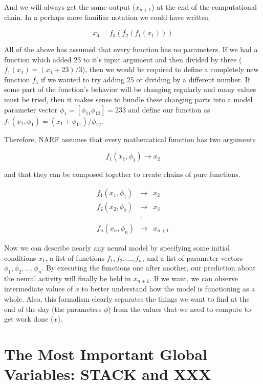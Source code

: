 \documentclass[letterpaper]{report}
\begin{document}
And we will always get the same output ($x_{n+1}$) at the end of the computational chain. In a perhaps more familiar notation we could have written

\begin{equation}
x_{4} = f_3(f_2(f_1(x_1)))
\end{equation}

All of the above has assumed that every function has no parameters. If we had a function which added 23 to it's input argument and then divided by three ($f_1(x_1) = (x_1 + 23) / 3 $), then we would be required to define a completely new function $f_1$ if we wanted to try adding 25 or dividing by a different number. If some part of the function's behavior will be changing regularly and many values must be tried, then it makes sense to bundle these changing parts into a model parameter vector $\phi_1 = [\phi_{11} \phi_{12}] = 23 3$ and define our function as $f_1(x_1, \phi_1) = (x_1 + \phi_{11}) / \phi_{12}$.

Therefore, NARF assumes that every mathematical function has two arguments

\begin{equation}
  f_1(x_1, \phi_1) \rightarrow x_2
\end{equation}

and that they can be composed together to create chains of pure functions. 

\begin{eqnarray*}
f_{1}(x_{1}, \phi_1) & \rightarrow & x_{2}\\
f_{2}(x_{2}, \phi_2) & \rightarrow & x_{3}\\
 & \vdots\\
f_{n}(x_{n}, \phi_n) & \rightarrow & x_{n+1}
\end{eqnarray*}

Now we can describe nearly any neural model by specifying some initial conditions $x_1$, a list of functions $f_1, f_2, ..., f_n$, and a list of parameter vectors $\phi_1, \phi_2, ..., \phi_n$. By executing the functions one after another, our prediction about the neural activity will finally be held in $x_{n+1}$. If we want, we can observe intermediate values of $x$ to better understand how the model is functioning as a whole. Also, this formalism clearly separates the things we want to find at the end of the day (the parameters $\phi$) from the values that we need to compute to get work done ($x$). 

\section{The Most Important Global Variables: STACK and XXX}
\end{document}
